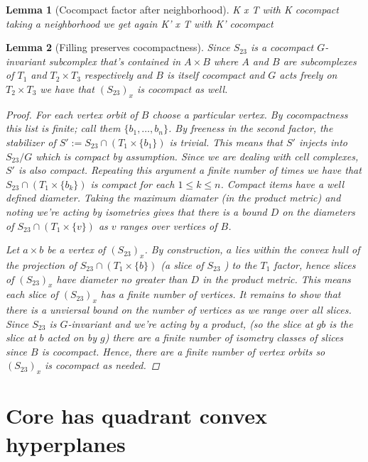 \documentclass{article}
\theoremstyle{mystyle}
\newtheorem{lem}{Lemma}[section]
\theoremstyle{remark}
\begin{document}
\begin{lem}
    [Cocompact factor after neighborhood]
    \label{lem:cocompactfactor} 
    K x T with K cocompact taking a neighborhood we get again K' x T with K' cocompact
\end{lem}
\begin{lem} 
[Filling preserves cocompactness]
\label{lem:fillingcocompact}
    Since $S_{23}$ is a cocompact $G$-invariant subcomplex that's contained in \(A \times B\) where \(A\) and \(B\) are subcomplexes of \(T_1\) and \(T_2 \times T_3\) respectively and \(B\) is itself cocompact and $G$ acts freely on $T_2\times T_3$ we have that $(S_{23})_x$ is cocompact as well. 
\begin{proof}
     For each vertex orbit of $B$ choose a particular vertex. By cocompactness this list is finite; call them $\{b_1,\ldots,b_n\}$. By freeness in the second factor, the stabilizer of $S' := S_{23} \cap (T_1 \times \{b_1\})$ is trivial. This means that $S'$ injects into $S_{23}/G$ which is compact by assumption. Since we are dealing with cell complexes, $S'$ is also compact. Repeating this argument a finite number of times we have that $S_{23}\cap (T_1\times \{b_k\})$ is compact for each \(1 \leq k \leq n \). Compact items have a well defined diameter. Taking the maximum diamater (in the product metric) and noting we're acting by isometries gives that there is a bound \(D\) on the diameters of \(S_{23} \cap (T_1\times \{v\})\) as \(v\) ranges over vertices of \(B\). 



    Let \(a \times b\) be a vertex of \((S_{23})_x\). By construction, \(a\) lies within the convex hull of the projection of \(S_{23} \cap (T_1\times \{b\})\) (a slice of \(S_{23}\) ) to the \(T_1\) factor, hence slices of \((S_{ 23 })_x\) have diameter no greater than \(D\) in the product metric. 
    This means each slice of \((S_{23})_x\) has a finite number of vertices. It remains to show that there is a unviersal bound on the number of vertices as we range over all slices. Since \(S_{23}\) is $G$-invariant and we're acting by a product, (so the slice at \(gb\) is the slice at \(b\) acted on by \(g\)) there are a finite number of isometry classes of slices since \(B\) is cocompact. Hence, there are a finite number of vertex orbits so \((S_{23})_x\) is cocompact as needed.
\end{proof}
\end{lem}


\section{Core has quadrant convex hyperplanes}
\end{document}
